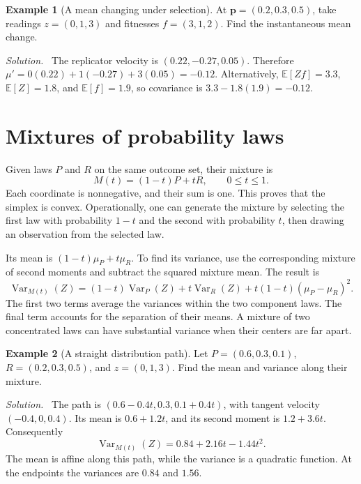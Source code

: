 \documentclass[11pt,oneside,openany]{book}
\theoremstyle{definition}
\newtheorem{example}{Example}[chapter]
\theoremstyle{remark}
\newenvironment{solution}{\par\smallskip\noindent\textit{Solution.}\ }{\par\smallskip}
\newcommand{\E}{\mathbb{E}}
\newcommand{\Var}{\operatorname{Var}}
\newcommand{\p}{\mathbf{p}}
\numberwithin{equation}{chapter}
\begin{document}
\begin{example}[A mean changing under selection]
At $\p=(0.2,0.3,0.5)$, take readings $z=(0,1,3)$ and fitnesses $f=(3,1,2)$. Find the instantaneous mean change.
\begin{solution}
The replicator velocity is $(0.22,-0.27,0.05)$. Therefore $\mu'=0(0.22)+1(-0.27)+3(0.05)=-0.12$. Alternatively, $\E[Zf]=3.3$, $\E[Z]=1.8$, and $\E[f]=1.9$, so covariance is $3.3-1.8(1.9)=-0.12$.
\end{solution}
\end{example}

\section{Mixtures of probability laws}
Given laws $P$ and $R$ on the same outcome set, their mixture is
\begin{equation}\label{eq:mixture}
M(t)=(1-t)P+tR,\qquad 0\leq t\leq1.
\end{equation}
Each coordinate is nonnegative, and their sum is one. This proves that the simplex is convex. Operationally, one can generate the mixture by selecting the first law with probability $1-t$ and the second with probability $t$, then drawing an observation from the selected law.

Its mean is $(1-t)\mu_P+t\mu_R$. To find its variance, use the corresponding mixture of second moments and subtract the squared mixture mean. The result is
\begin{equation}\label{eq:mixturevariance}
\Var_{M(t)}(Z)=(1-t)\Var_P(Z)+t\Var_R(Z)
+t(1-t)(\mu_P-\mu_R)^2.
\end{equation}
The first two terms average the variances within the two component laws. The final term accounts for the separation of their means. A mixture of two concentrated laws can have substantial variance when their centers are far apart.

\begin{example}[A straight distribution path]
Let $P=(0.6,0.3,0.1)$, $R=(0.2,0.3,0.5)$, and $z=(0,1,3)$. Find the mean and variance along their mixture.
\begin{solution}
The path is $(0.6-0.4t,0.3,0.1+0.4t)$, with tangent velocity $(-0.4,0,0.4)$. Its mean is $0.6+1.2t$, and its second moment is $1.2+3.6t$. Consequently
\[
\Var_{M(t)}(Z)=0.84+2.16t-1.44t^2.
\]
The mean is affine along this path, while the variance is a quadratic function. At the endpoints the variances are $0.84$ and $1.56$.
\end{solution}
\end{example}
\end{document}
